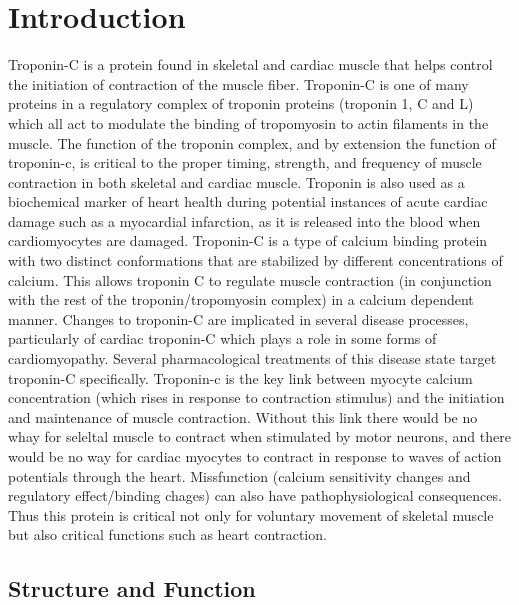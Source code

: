 \documentclass[12pt]{article}
\begin{document}
	\section{Introduction}
	Troponin-C is a protein found in skeletal and cardiac muscle that helps control the initiation of contraction of the muscle fiber.\cite{Li2015} Troponin-C is one of many proteins in a  regulatory complex of troponin proteins (troponin 1, C and L) which all act to modulate the binding of tropomyosin to actin filaments in the muscle. The function of the troponin complex, and by extension the function of troponin-c, is critical to the proper timing, strength, and frequency of muscle contraction in both skeletal and cardiac muscle.\cite{Li2015} Troponin is also used as a biochemical marker of heart health during potential instances of acute cardiac damage such as a myocardial infarction, as it is released into the blood when cardiomyocytes are damaged.\cite{Melanson2007} Troponin-C is a type of calcium binding protein with two distinct conformations that are stabilized by different concentrations of calcium.\cite{Strasburg1980,Rao1996,Greaser1973} This allows troponin C to regulate muscle contraction (in conjunction with the rest of the troponin/tropomyosin complex) in a calcium dependent manner. Changes to troponin-C are implicated in several disease processes, particularly of cardiac troponin-C which plays a role in some forms of cardiomyopathy. Several pharmacological treatments of this disease state target troponin-C specifically.\cite{Melanson2007} Troponin-c is the key link between myocyte calcium concentration (which rises in response to contraction stimulus) and the initiation and maintenance of muscle contraction.\cite{Li2015} Without this link there would be no whay for seleltal muscle to contract when stimulated by motor neurons, and there would be no way for cardiac myocytes to contract in response to waves of action potentials through the heart. Missfunction (calcium sensitivity changes and regulatory effect/binding chages) can also have pathophysiological consequences.\cite{Li2015} Thus this protein is critical not only for voluntary movement of skeletal muscle but also critical functions such as heart contraction.
	
	\subsection{Structure and Function}
	
\end{document}
